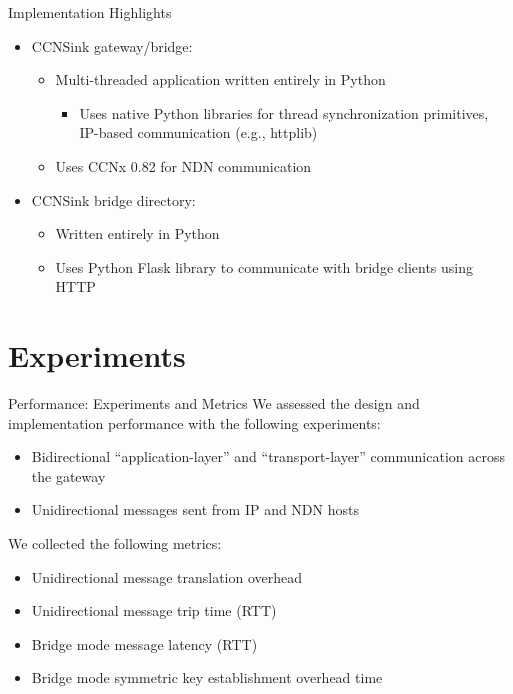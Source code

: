 \documentclass[handout]{beamer}
\begin{document}
\begin{frame}{Implementation Highlights}
	\begin{itemize}
		\item {\sf CCNSink} gateway/bridge: 
		\begin{itemize}
			\item Multi-threaded application written entirely in Python 
			\begin{itemize}
				\item Uses native Python libraries for thread synchronization primitives, IP-based communication (e.g., httplib)
			\end{itemize}
			\item Uses CCNx 0.82 for NDN communication
		\end{itemize}
		\item {\sf CCNSink} bridge directory: 
		\begin{itemize}
			\item Written entirely in Python
			\item Uses Python Flask library to communicate with bridge clients using HTTP
		\end{itemize}
	\end{itemize}
\end{frame}

\section{Experiments}
\begin{frame}{Performance: Experiments and Metrics}
	We assessed the design and implementation performance with the following experiments:
	\begin{itemize}
		\item Bidirectional ``application-layer'' and ``transport-layer'' communication across the gateway
		\item Unidirectional messages sent from IP and NDN hosts
	\end{itemize}
	We collected the following metrics:
	\begin{itemize}
		\item Unidirectional message translation overhead
		\item Unidirectional message trip time (RTT)
		\item Bridge mode message latency (RTT)
		\item Bridge mode symmetric key establishment overhead time
	\end{itemize}
\end{frame}
\end{document}
